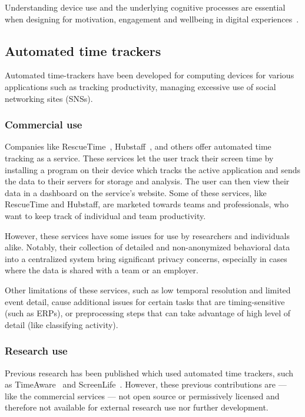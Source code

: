 \documentclass{IEEEtran}
\begin{document}
Understanding device use and the underlying cognitive processes are essential when designing for motivation, engagement and wellbeing in digital experiences~\cite{peters_designing_2018}.

\subsection{Automated time trackers}

Automated time-trackers have been developed for computing devices for various applications such as tracking productivity, managing excessive use of social networking sites (SNSs).

\subsubsection{Commercial use}

Companies like RescueTime~\cite{noauthor_rescuetime_nodate}, Hubstaff~\cite{noauthor_hubstaff_nodate}, and others offer automated time tracking as a service. These services let the user track their screen time by installing a program on their device which tracks the active application and sends the data to their servers for storage and analysis. The user can then view their data in a dashboard on the service's website. Some of these services, like RescueTime and Hubstaff, are marketed towards teams and professionals, who want to keep track of individual and team productivity.

However, these services have some issues for use by researchers and individuals alike. Notably, their collection of detailed and non-anonymized behavioral data into a centralized system bring significant privacy concerns, especially in cases where the data is shared with a team or an employer.

Other limitations of these services, such as low temporal resolution and limited event detail, cause additional issues for certain tasks that are timing-sensitive (such as ERPs), or preprocessing steps that can take advantage of high level of detail (like classifying activity).

\subsubsection{Research use}

Previous research has been published which used automated time trackers, such as TimeAware~\cite{kim_timeaware_2016} and ScreenLife~\cite{rooksby_personal_2016}. However, these previous contributions are --- like the commercial services --- not open source or permissively licensed and therefore not available for external research use nor further development.
\end{document}
